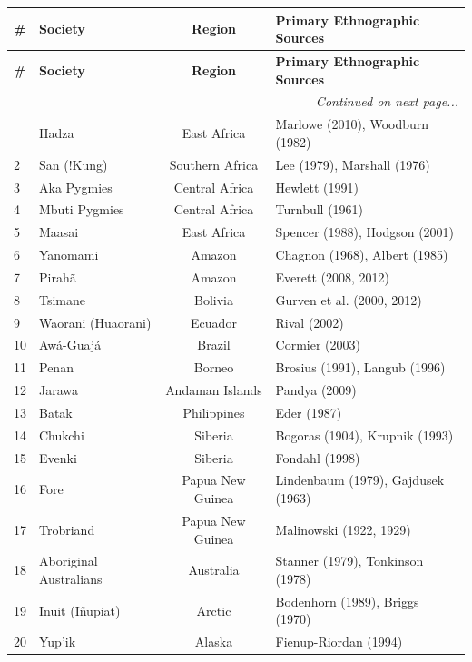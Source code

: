 \begin{center}
\scriptsize
\begin{longtable}{@{}llcp{4.5cm}@{}}
\toprule
\textbf{\#} & \textbf{Society} & \textbf{Region} & \textbf{Primary Ethnographic Sources} \\
\midrule
\endfirsthead
\toprule
\textbf{\#} & \textbf{Society} & \textbf{Region} & \textbf{Primary Ethnographic Sources} \\
\midrule
\endhead
\multicolumn{4}{r}{\textit{Continued on next page...}} \\
\endfoot
\bottomrule
\endlastfoot
1 & Hadza & East Africa & Marlowe (2010), Woodburn (1982) \\
2 & San (!Kung) & Southern Africa & Lee (1979), Marshall (1976) \\
3 & Aka Pygmies & Central Africa & Hewlett (1991) \\
4 & Mbuti Pygmies & Central Africa & Turnbull (1961) \\
5 & Maasai & East Africa & Spencer (1988), Hodgson (2001) \\
\midrule
6 & Yanomami & Amazon & Chagnon (1968), Albert (1985) \\
7 & Pirahã & Amazon & Everett (2008, 2012) \\
8 & Tsimane & Bolivia & Gurven et al. (2000, 2012) \\
9 & Waorani (Huaorani) & Ecuador & Rival (2002) \\
10 & Awá-Guajá & Brazil & Cormier (2003) \\
\midrule
11 & Penan & Borneo & Brosius (1991), Langub (1996) \\
12 & Jarawa & Andaman Islands & Pandya (2009) \\
13 & Batak & Philippines & Eder (1987) \\
14 & Chukchi & Siberia & Bogoras (1904), Krupnik (1993) \\
15 & Evenki & Siberia & Fondahl (1998) \\
\midrule
16 & Fore & Papua New Guinea & Lindenbaum (1979), Gajdusek (1963) \\
17 & Trobriand & Papua New Guinea & Malinowski (1922, 1929) \\
18 & Aboriginal Australians & Australia & Stanner (1979), Tonkinson (1978) \\
\midrule
19 & Inuit (Iñupiat) & Arctic & Bodenhorn (1989), Briggs (1970) \\
20 & Yup'ik & Alaska & Fienup-Riordan (1994) \\
\end{longtable}
\end{center}

